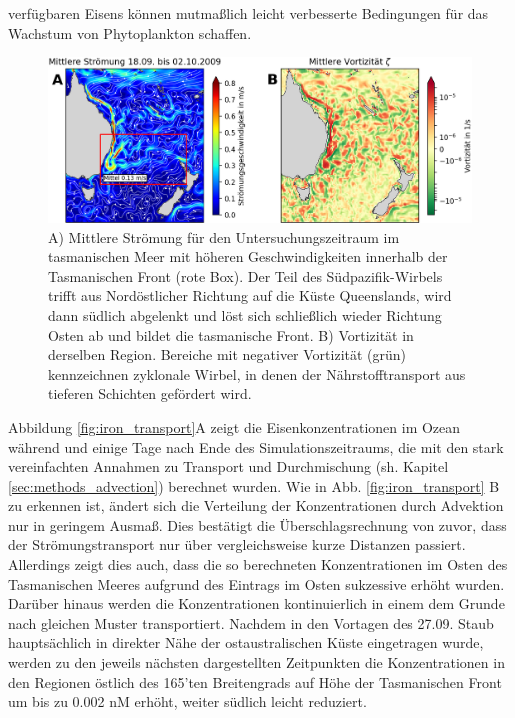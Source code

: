 \documentclass[12pt,a4paper,onecolumn,headheight=30pt]{scrartcl}
\begin{document}
verfügbaren Eisens können mutmaßlich leicht verbesserte Bedingungen für das Wachstum von Phytoplankton schaffen.
\begin{figure}[htbp]
\includegraphics[width=\textwidth]{bilder/currents_mean.png}
\caption{A) Mittlere Strömung für den Untersuchungszeitraum im tasmanischen Meer mit höheren Geschwindigkeiten innerhalb der Tasmanischen Front (rote Box). Der Teil des Südpazifik-Wirbels trifft aus Nordöstlicher Richtung auf die Küste Queenslands, wird dann südlich abgelenkt und löst sich schließlich wieder Richtung Osten ab und bildet die tasmanische Front. B) Vortizität in derselben Region. Bereiche mit negativer Vortizität (grün) kennzeichnen zyklonale Wirbel, in denen der Nährstofftransport aus tieferen Schichten gefördert wird. } \label{fig:tasman_current}
\end{figure}
Abbildung \ref{fig:iron_transport}A zeigt die Eisenkonzentrationen im Ozean während und einige Tage nach Ende des Simulationszeitraums, die mit den stark vereinfachten Annahmen zu Transport und Durchmischung (sh. Kapitel \ref{sec:methods_advection}) berechnet wurden. Wie in Abb. \ref{fig:iron_transport} B zu erkennen ist, ändert sich die Verteilung der Konzentrationen durch Advektion nur in geringem Ausmaß. Dies bestätigt die Überschlagsrechnung von zuvor, dass der Strömungstransport nur über vergleichsweise kurze Distanzen passiert. Allerdings zeigt dies auch, dass die so berechneten Konzentrationen im Osten des Tasmanischen Meeres aufgrund des Eintrags im Osten sukzessive erhöht wurden. Darüber hinaus werden die Konzentrationen kontinuierlich in einem dem Grunde nach gleichen Muster transportiert. Nachdem in den Vortagen des 27.09. Staub hauptsächlich in direkter Nähe der ostaustralischen Küste eingetragen wurde, werden zu den jeweils nächsten dargestellten Zeitpunkten die Konzentrationen in den Regionen östlich des 165'ten Breitengrads auf Höhe der Tasmanischen Front um bis zu 0.002 nM erhöht, weiter südlich leicht reduziert.
\end{document}
